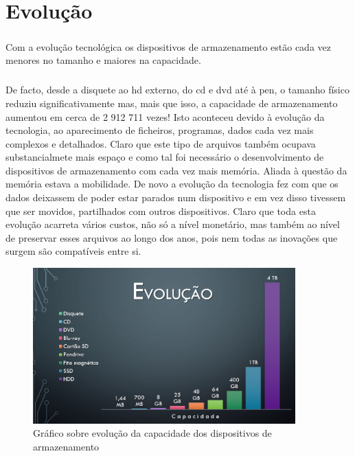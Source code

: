 \documentclass[a4paper]{report}
\begin{document}
\newpage

\chapter{Evolução}
\label{chap.evolucao}

\paragraph*{}Com a evolução tecnológica os dispositivos de armazenamento estão cada vez menores no tamanho e maiores na capacidade.

\paragraph{}De facto, desde a disquete ao \ac{hd} externo, do \ac{cd} e \ac{dvd} até à pen, o tamanho físico reduziu significativamente mas, mais que isso, a capacidade de armazenamento aumentou em cerca de 2 912 711 vezes! Isto aconteceu devido à evolução da tecnologia, ao aparecimento de ficheiros, programas, dados cada vez mais complexos e detalhados. Claro que este tipo de arquivos também ocupava substancialmete mais espaço e como tal foi necessário o desenvolvimento de dispositivos de armazenamento com cada vez mais memória. Aliada à questão da memória estava a mobilidade. De novo a evolução da tecnologia fez com que os dados deixassem de poder estar parados num dispositivo e em vez disso tivessem que ser movidos, partilhados com outros dispositivos. Claro que toda esta evolução acarreta vários custos, não só a nível monetário, mas também ao nível de preservar esses arquivos ao longo dos anos, pois nem todas as inovações que surgem são compatíveis entre si. 

\begin{figure}[H]
\center
\includegraphics[height=6cm]{Imagens/grafico1.png}
\caption{Gráfico sobre evolução da capacidade dos dispositivos de armazenamento}
\end{figure}
\end{document}
